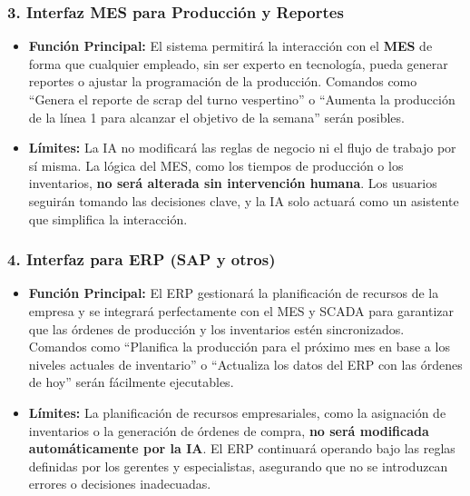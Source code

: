\documentclass[
  10pt,
  letterpaper,
]{book}
\providecommand{\tightlist}{%
  \setlength{\itemsep}{0pt}\setlength{\parskip}{0pt}}\usepackage{longtable,booktabs,array}
\begin{document}
\subsubsection{\texorpdfstring{3. \textbf{Interfaz MES para Producción y
Reportes}}{3. Interfaz MES para Producción y Reportes}}\label{interfaz-mes-para-producciuxf3n-y-reportes}

\begin{itemize}
\tightlist
\item
  \textbf{Función Principal:} El sistema permitirá la interacción con el
  \textbf{MES} de forma que cualquier empleado, sin ser experto en
  tecnología, pueda generar reportes o ajustar la programación de la
  producción. Comandos como ``Genera el reporte de scrap del turno
  vespertino'' o ``Aumenta la producción de la línea 1 para alcanzar el
  objetivo de la semana'' serán posibles.
\item
  \textbf{Límites:} La IA no modificará las reglas de negocio ni el
  flujo de trabajo por sí misma. La lógica del MES, como los tiempos de
  producción o los inventarios, \textbf{no será alterada sin
  intervención humana}. Los usuarios seguirán tomando las decisiones
  clave, y la IA solo actuará como un asistente que simplifica la
  interacción.
\end{itemize}

\subsubsection{\texorpdfstring{4. \textbf{Interfaz para ERP (SAP y
otros)}}{4. Interfaz para ERP (SAP y otros)}}\label{interfaz-para-erp-sap-y-otros}

\begin{itemize}
\tightlist
\item
  \textbf{Función Principal:} El ERP gestionará la planificación de
  recursos de la empresa y se integrará perfectamente con el MES y SCADA
  para garantizar que las órdenes de producción y los inventarios estén
  sincronizados. Comandos como ``Planifica la producción para el próximo
  mes en base a los niveles actuales de inventario'' o ``Actualiza los
  datos del ERP con las órdenes de hoy'' serán fácilmente ejecutables.
\item
  \textbf{Límites:} La planificación de recursos empresariales, como la
  asignación de inventarios o la generación de órdenes de compra,
  \textbf{no será modificada automáticamente por la IA}. El ERP
  continuará operando bajo las reglas definidas por los gerentes y
  especialistas, asegurando que no se introduzcan errores o decisiones
  inadecuadas.
\end{itemize}
\end{document}
